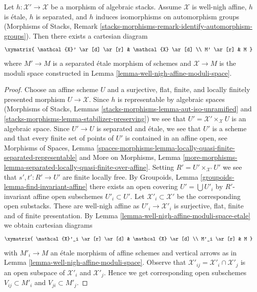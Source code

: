 \begin{lemma}
\label{lemma-etale-separated-over-well-nigh-affine}
Let $h : \mathcal{X}' \to \mathcal{X}$ be a morphism of algebraic stacks.
Assume $\mathcal{X}$ is well-nigh affine, $h$ is \'etale, $h$ is separated,
and $h$ induces isomorphisms on automorphism groups
(Morphisms of Stacks, Remark
\ref{stacks-morphisms-remark-identify-automorphism-groups}).
Then there exists a cartesian diagram
$$
\xymatrix{
\mathcal{X}' \ar[d] \ar[r] & \mathcal{X} \ar[d] \\
M' \ar[r] & M
}
$$
where $M' \to M$ is a separated \'etale morphism of schemes and
$\mathcal{X} \to M$ is the moduli space constructed in
Lemma \ref{lemma-well-nigh-affine-moduli-space}.
\end{lemma}

\begin{proof}
Choose an affine scheme $U$ and a surjective, flat, finite, and
locally finitely presented morphism $U \to \mathcal{X}$.
Since $h$ is representable by algebraic spaces
(Morphisms of Stacks, Lemmas
\ref{stacks-morphisms-lemma-aut-iso-unramified} and
\ref{stacks-morphisms-lemma-stabilizer-preserving})
we see that $U' = \mathcal{X}' \times_\mathcal{X} U$ is
an algebraic space. Since $U' \to U$ is separated and \'etale,
we see that $U'$ is a scheme and that every finite set of points
of $U'$ is contained in an affine open, see
Morphisms of Spaces, Lemma
\ref{spaces-morphisms-lemma-locally-quasi-finite-separated-representable}
and
More on Morphisms, Lemma
\ref{more-morphisms-lemma-separated-locally-quasi-finite-over-affine}.
Setting $R' = U' \times_{\mathcal{X}'} U'$ we see
that $s', t' : R' \to U'$ are finite locally free.
By Groupoids, Lemma \ref{groupoids-lemma-find-invariant-affine}
there exists an open covering $U' = \bigcup U'_i$ by
$R'$-invariant affine open subschemes $U'_i \subset U'$.
Let $\mathcal{X}'_i \subset \mathcal{X}'$ be the corresponding
open substacks. These are well-nigh affine as $U'_i \to \mathcal{X}'_i$
is surjective, flat, finite and of finite presentation. By
Lemma \ref{lemma-well-nigh-affine-moduli-space-etale}
we obtain cartesian diagrams
$$
\xymatrix{
\mathcal{X}'_i \ar[r] \ar[d] & \mathcal{X} \ar[d] \\
M'_i \ar[r] & M
}
$$
with $M'_i \to M$ an \'etale morphism of affine schemes
and vertical arrows as in
Lemma \ref{lemma-well-nigh-affine-moduli-space}.
Observe that
$\mathcal{X}'_{ij} = \mathcal{X}'_i \cap \mathcal{X}'_j$
is an open subspace of $\mathcal{X}'_i$ and $\mathcal{X}'_j$.
Hence we get corresponding open subschemes
$V_{ij} \subset M'_i$ and $V_{ji} \subset M'_j$.

\end{proof}
